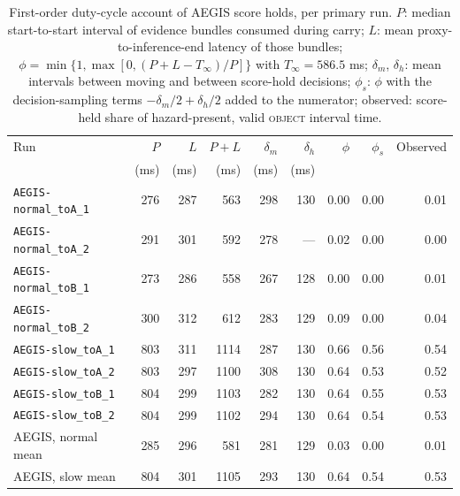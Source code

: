 \begin{table}[H]\centering\small
\caption{First-order duty-cycle account of AEGIS score holds, per primary run. $P$: median start-to-start interval of evidence bundles consumed during carry; $L$: mean proxy-to-inference-end latency of those bundles; $\phi=\min\{1,\max[0,(P+L-T_\infty)/P]\}$ with $T_\infty=586.5$ ms; $\delta_m$, $\delta_h$: mean intervals between moving and between score-hold decisions; $\phi_s$: $\phi$ with the decision-sampling terms $-\delta_m/2+\delta_h/2$ added to the numerator; observed: score-held share of hazard-present, valid \textsc{object} interval time.}\label{tab:duty}
\begin{tabular}{@{}lrrrrrrrr@{}}
\toprule Run&$P$&$L$&$P+L$&$\delta_m$&$\delta_h$&$\phi$&$\phi_s$&Observed\\ &(ms)&(ms)&(ms)&(ms)&(ms)&&&\\ \midrule
\texttt{AEGIS-normal\_toA\_1}&276&287&563&298&130&0.00&0.00&0.01\\
\texttt{AEGIS-normal\_toA\_2}&291&301&592&278&---&0.02&0.00&0.00\\
\texttt{AEGIS-normal\_toB\_1}&273&286&558&267&128&0.00&0.00&0.01\\
\texttt{AEGIS-normal\_toB\_2}&300&312&612&283&129&0.09&0.00&0.04\\
\texttt{AEGIS-slow\_toA\_1}&803&311&1114&287&130&0.66&0.56&0.54\\
\texttt{AEGIS-slow\_toA\_2}&803&297&1100&308&130&0.64&0.53&0.52\\
\texttt{AEGIS-slow\_toB\_1}&804&299&1103&282&130&0.64&0.55&0.53\\
\texttt{AEGIS-slow\_toB\_2}&804&299&1102&294&130&0.64&0.54&0.53\\
\midrule
AEGIS, normal mean&285&296&581&281&129&0.03&0.00&0.01\\
AEGIS, slow mean&804&301&1105&293&130&0.64&0.54&0.53\\
\bottomrule
\end{tabular}
\end{table}
